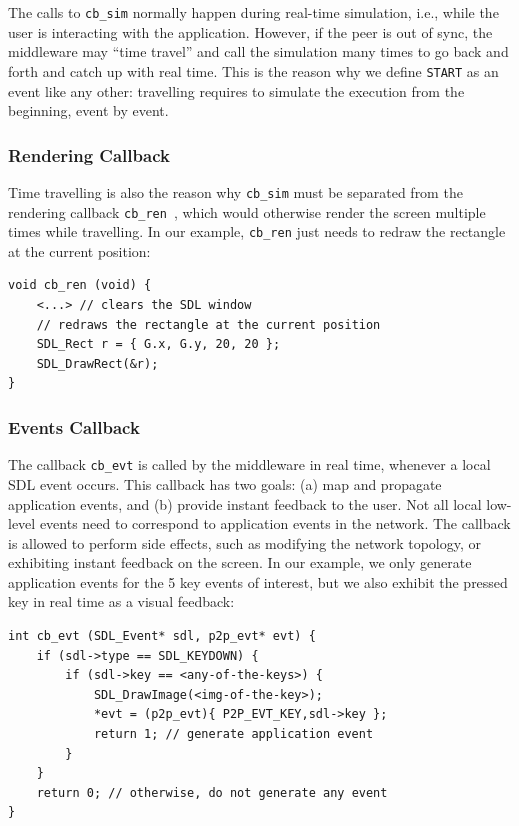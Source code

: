 \documentclass[fleqn,10pt]{SelfArx}
\newcommand{\code}[1]  {\texttt{\footnotesize{#1}}}
\begin{document}
The calls to \code{cb\_sim} normally happen during real-time simulation, i.e.,
while the user is interacting with the application.
However, if the peer is out of sync, the middleware may ``time travel'' and
call the simulation many times to go back and forth and catch up with real
time.
This is the reason why we define \code{START} as an event like any other:
travelling requires to simulate the execution from the beginning, event by
event.

\subsubsection{Rendering Callback}
\label{sec.tml.api.cb_ren}

Time travelling is also the reason why \code{cb\_sim} must be separated from
the rendering callback \code{cb\_ren}~\cite{tml.js}, which would otherwise
render the screen multiple times while travelling.
In our example, \code{cb\_ren} just needs to redraw the rectangle at the
current position:

{\footnotesize
\begin{verbatim}
void cb_ren (void) {
    <...> // clears the SDL window
    // redraws the rectangle at the current position
    SDL_Rect r = { G.x, G.y, 20, 20 };
    SDL_DrawRect(&r);
}
\end{verbatim}
}

\subsubsection{Events Callback}
\label{sec.tml.api.cb_evt}

The callback \code{cb\_evt} is called by the middleware in real time, whenever
a local SDL event occurs.
This callback has two goals:
    (a) map and propagate application events, and
    (b) provide instant feedback to the user.
Not all local low-level events need to correspond to application events in the
network.
The callback is allowed to perform side effects, such as modifying the network
topology, or exhibiting instant feedback on the screen.
In our example, we only generate application events for the 5 key events of
interest, but we also exhibit the pressed key in real time as a visual
feedback:

{\footnotesize
\begin{verbatim}
int cb_evt (SDL_Event* sdl, p2p_evt* evt) {
    if (sdl->type == SDL_KEYDOWN) {
        if (sdl->key == <any-of-the-keys>) {
            SDL_DrawImage(<img-of-the-key>);
            *evt = (p2p_evt){ P2P_EVT_KEY,sdl->key };
            return 1; // generate application event
        }
    }
    return 0; // otherwise, do not generate any event
}
\end{verbatim}
}
\end{document}
